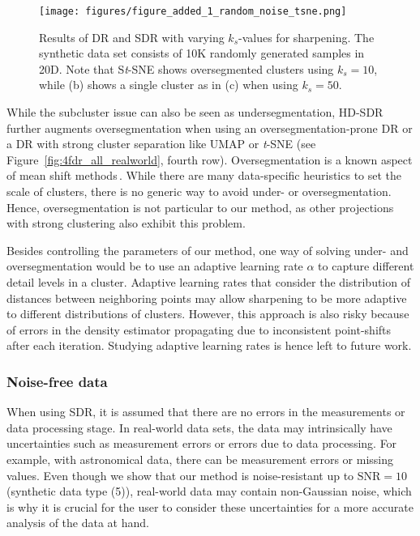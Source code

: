 \documentclass[sagev,Afour,times]{sagej}
\begin{document}
\begin{figure}[htb]
    \centering
    \texttt{[image: figures/figure\_added\_1\_random\_noise\_tsne.png]}
    \parbox[t]{1\columnwidth}{\relax}
    \caption{\label{fig:added_1_randomNoise} Results of DR and SDR with varying $k_s$-values for sharpening. The synthetic data set consists of 10$\mathrm{K}$ randomly generated samples in 20D. Note that S\emph{t}-SNE shows oversegmented clusters using $k_s=10$, while (b) shows a single cluster as in (c) when using $k_s=50$.}
\end{figure}

While the subcluster issue can also be seen as undersegmentation, HD-SDR further augments oversegmentation when using an oversegmentation-prone DR or a DR with strong cluster separation like UMAP or \emph{t}-SNE (see Figure~\ref{fig:4fdr_all_realworld}, fourth row). Oversegmentation is a known aspect of mean shift methods\,\cite{alex1}. While there are many data-specific heuristics to set the scale of clusters, there is no generic way to avoid under- or oversegmentation. Hence, oversegmentation is not particular to our method, as other projections with strong clustering also exhibit this problem.

Besides controlling the parameters of our method, one way of solving under- and oversegmentation would be to use an adaptive learning rate $\alpha$ to capture different detail levels in a cluster. Adaptive learning rates that consider the distribution of distances between neighboring points may allow sharpening to be more adaptive to different distributions of clusters. However, this approach is also risky because of errors in the density estimator propagating due to inconsistent point-shifts after each iteration. Studying adaptive learning rates is hence left to future work.


\subsubsection{Noise-free data}
\label{sec:discussion:sharpenNoise}
When using SDR, it is assumed that there are no errors in the measurements or data processing stage. In real-world data sets, the data may intrinsically have uncertainties such as measurement errors or errors due to data processing. For example, with astronomical data, there can be measurement errors or missing values. Even though we show that our method is noise-resistant up to $\mbox{SNR}=10$ (synthetic data type (5)), real-world data may contain non-Gaussian noise, which is why it is crucial for the user to consider these uncertainties for a more accurate analysis of the data at hand.
\end{document}
